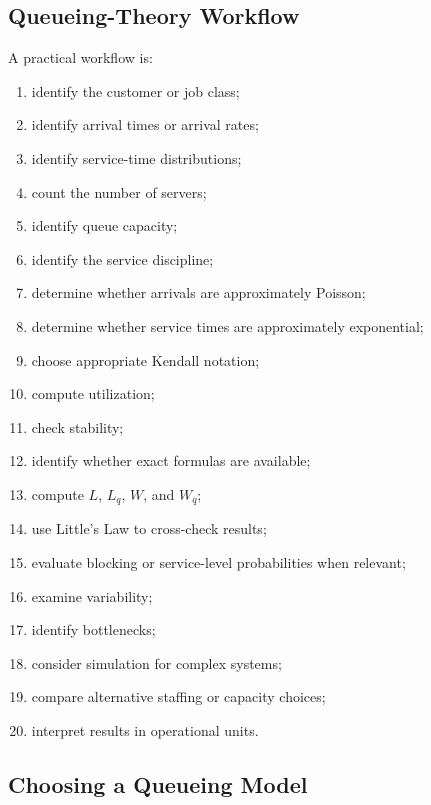 \subsection{Queueing-Theory Workflow}
\label{subsec:queueing-workflow}

A practical workflow is:

\begin{enumerate}
    \item identify the customer or job class;
    \item identify arrival times or arrival rates;
    \item identify service-time distributions;
    \item count the number of servers;
    \item identify queue capacity;
    \item identify the service discipline;
    \item determine whether arrivals are approximately Poisson;
    \item determine whether service times are approximately exponential;
    \item choose appropriate Kendall notation;
    \item compute utilization;
    \item check stability;
    \item identify whether exact formulas are available;
    \item compute \(L\), \(L_q\), \(W\), and \(W_q\);
    \item use Little's Law to cross-check results;
    \item evaluate blocking or service-level probabilities when relevant;
    \item examine variability;
    \item identify bottlenecks;
    \item consider simulation for complex systems;
    \item compare alternative staffing or capacity choices;
    \item interpret results in operational units.
\end{enumerate}

\subsection{Choosing a Queueing Model}
\label{subsec:choosing-queueing-model}

